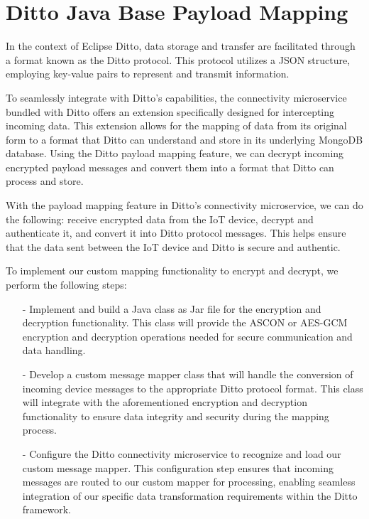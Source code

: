 
\section{Ditto Java Base Payload Mapping}

In the context of Eclipse Ditto, data storage and transfer are facilitated through a format known as the Ditto protocol. This protocol utilizes a JSON structure, employing key-value pairs to represent and transmit information.

To seamlessly integrate with Ditto's capabilities, the connectivity microservice bundled with Ditto offers an extension specifically designed for intercepting incoming data. This extension allows for the mapping of data from its original form to a format that Ditto can understand and store in its underlying MongoDB database. Using the Ditto payload mapping feature, we can decrypt incoming encrypted payload messages and convert them into a format that Ditto can process and store.
 
With the payload mapping feature in Ditto's connectivity microservice, we can do the following: receive encrypted data from the IoT device, decrypt and authenticate it, and convert it into Ditto protocol messages. This helps ensure that the data sent between the IoT device and Ditto is secure and authentic.

To implement our custom mapping functionality to encrypt and decrypt, we perform the following steps:
\begin{itemize}
    \item[-] Implement and build a Java class as Jar file for the encryption and decryption functionality. This class will provide the ASCON or AES-GCM encryption and decryption operations needed for secure communication and data handling. 
    \item[-] Develop a custom message mapper class that will handle the conversion of incoming device messages to the appropriate Ditto protocol format. This class will integrate with the aforementioned encryption and decryption functionality to ensure data integrity and security during the mapping process.
    \item[-]Configure the Ditto connectivity microservice to recognize and load our custom message mapper. This configuration step ensures that incoming messages are routed to our custom mapper for processing, enabling seamless integration of our specific data transformation requirements within the Ditto framework.
\end{itemize}







